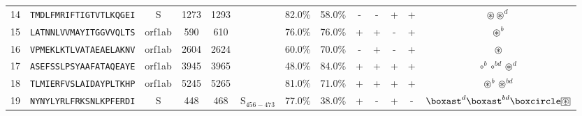\begin{tabular}{rcccccccccccc}
14 &  \texttt{TMDLFMRIFTIGTVTLKQGEI} &       S &   1273 &  1293 &                &                          82.0\% &                           58.0\% &          - &           - &          + &           + &                                                                                                 $ \circledast \circledast^d $ \\
15 &  \texttt{LATNNLVVMAYITGGVVQLTS} &  orf1ab &    590 &   610 &                &                          76.0\% &                           76.0\% &          + &           + &          - &           + &                                                                                                             $ \circledast^b $ \\
16 &  \texttt{VPMEKLKTLVATAEAELAKNV} &  orf1ab &   2604 &  2624 &                &                          60.0\% &                           70.0\% &          - &           + &          - &           + &                                                                                                               $ \circledast $ \\
17 &  \texttt{ASEFSSLPSYAAFATAQEAYE} &  orf1ab &   3945 &  3965 &                &                          48.0\% &                           84.0\% &          + &           + &          + &           + &                                                                                          $ \circ^b \circ^{bd} \circledast^d $ \\
18 &  \texttt{TLMIERFVSLAIDAYPLTKHP} &  orf1ab &   5245 &  5265 &                &                          81.0\% &                           71.0\% &          + &           + &          + &           + &                                                                                            $ \circledast^b \circledast^{bd} $ \\
19 &  \texttt{NYNYLYRLFRKSNLKPFERDI} &       S &    448 &   468 &  S$_{456-473}$ &                          77.0\% &                           38.0\% &          + &           - &          + &           - &                                         $ \boxast^d \boxast^{bd} \boxcircle \setlength{\fboxsep}{0.5pt} \boxed{\circledast} $ \\
\bottomrule
\end{tabular}
